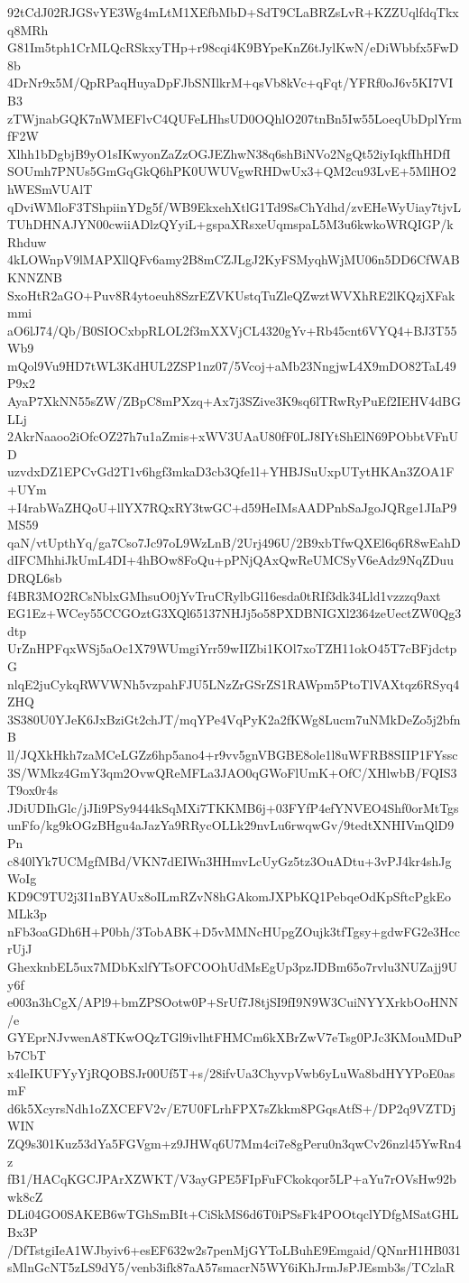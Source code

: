 92tCdJ02RJGSvYE3Wg4mLtM1XEfbMbD+SdT9CLaBRZsLvR+KZZUqlfdqTkxq8MRh
G81Im5tph1CrMLQcRSkxyTHp+r98cqi4K9BYpeKnZ6tJylKwN/eDiWbbfx5FwD8b
4DrNr9x5M/QpRPaqHuyaDpFJbSNIlkrM+qsVb8kVc+qFqt/YFRf0oJ6v5KI7VIB3
zTWjnabGQK7nWMEFlvC4QUFeLHhsUD0OQhlO207tnBn5Iw55LoeqUbDplYrmfF2W
Xlhh1bDgbjB9yO1sIKwyonZaZzOGJEZhwN38q6shBiNVo2NgQt52iyIqkfIhHDfI
SOUmh7PNUs5GmGqGkQ6hPK0UWUVgwRHDwUx3+QM2cu93LvE+5MlHO2hWESmVUAlT
qDviWMloF3TShpiinYDg5f/WB9EkxehXtlG1Td9SsChYdhd/zvEHeWyUiay7tjvL
TUhDHNAJYN00cwiiADlzQYyiL+gspaXRsxeUqmspaL5M3u6kwkoWRQIGP/kRhduw
4kLOWnpV9lMAPXllQFv6amy2B8mCZJLgJ2KyFSMyqhWjMU06n5DD6CfWABKNNZNB
SxoHtR2aGO+Puv8R4ytoeuh8SzrEZVKUstqTuZleQZwztWVXhRE2lKQzjXFakmmi
aO6lJ74/Qb/B0SIOCxbpRLOL2f3mXXVjCL4320gYv+Rb45cnt6VYQ4+BJ3T55Wb9
mQol9Vu9HD7tWL3KdHUL2ZSP1nz07/5Vcoj+aMb23NngjwL4X9mDO82TaL49P9x2
AyaP7XkNN55sZW/ZBpC8mPXzq+Ax7j3SZive3K9sq6lTRwRyPuEf2IEHV4dBGLLj
2AkrNaaoo2iOfcOZ27h7u1aZmis+xWV3UAaU80fF0LJ8IYtShElN69PObbtVFnUD
uzvdxDZ1EPCvGd2T1v6hgf3mkaD3cb3Qfe1l+YHBJSuUxpUTytHKAn3ZOA1F+UYm
+I4rabWaZHQoU+llYX7RQxRY3twGC+d59HeIMsAADPnbSaJgoJQRge1JIaP9MS59
qaN/vtUpthYq/ga7Cso7Jc97oL9WzLnB/2Urj496U/2B9xbTfwQXEl6q6R8wEahD
dIFCMhhiJkUmL4DI+4hBOw8FoQu+pPNjQAxQwReUMCSyV6eAdz9NqZDuuDRQL6sb
f4BR3MO2RCsNblxGMhsuO0jYvTruCRylbGl16esda0tRIf3dk34Lld1vzzzq9axt
EG1Ez+WCey55CCGOztG3XQl65137NHJj5o58PXDBNIGXl2364zeUectZW0Qg3dtp
UrZnHPFqxWSj5aOc1X79WUmgiYrr59wIIZbi1KOl7xoTZH11okO45T7cBFjdctpG
nlqE2juCykqRWVWNh5vzpahFJU5LNzZrGSrZS1RAWpm5PtoTlVAXtqz6RSyq4ZHQ
3S380U0YJeK6JxBziGt2chJT/mqYPe4VqPyK2a2fKWg8Lucm7uNMkDeZo5j2bfnB
ll/JQXkHkh7zaMCeLGZz6hp5ano4+r9vv5gnVBGBE8ole1l8uWFRB8SIIP1FYssc
3S/WMkz4GmY3qm2OvwQReMFLa3JAO0qGWoFlUmK+OfC/XHlwbB/FQIS3T9ox0r4s
JDiUDIhGlc/jJIi9PSy9444kSqMXi7TKKMB6j+03FYfP4efYNVEO4Shf0orMtTgs
unFfo/kg9kOGzBHgu4aJazYa9RRycOLLk29nvLu6rwqwGv/9tedtXNHIVmQlD9Pn
c840lYk7UCMgfMBd/VKN7dEIWn3HHmvLcUyGz5tz3OuADtu+3vPJ4kr4shJgWoIg
KD9C9TU2j3I1nBYAUx8oILmRZvN8hGAkomJXPbKQ1PebqeOdKpSftcPgkEoMLk3p
nFb3oaGDh6H+P0bh/3TobABK+D5vMMNcHUpgZOujk3tfTgsy+gdwFG2e3HccrUjJ
GhexknbEL5ux7MDbKxlfYTsOFCOOhUdMsEgUp3pzJDBm65o7rvlu3NUZajj9Uy6f
e003n3hCgX/APl9+bmZPSOotw0P+SrUf7J8tjSI9fI9N9W3CuiNYYXrkbOoHNN/e
GYEprNJvwenA8TKwOQzTGl9ivlhtFHMCm6kXBrZwV7eTsg0PJc3KMouMDuPb7CbT
x4leIKUFYyYjRQOBSJr00Uf5T+s/28ifvUa3ChyvpVwb6yLuWa8bdHYYPoE0asmF
d6k5XcyrsNdh1oZXCEFV2v/E7U0FLrhFPX7sZkkm8PGqsAtfS+/DP2q9VZTDjWIN
ZQ9s301Kuz53dYa5FGVgm+z9JHWq6U7Mm4ci7e8gPeru0n3qwCv26nzl45YwRn4z
fB1/HACqKGCJPArXZWKT/V3ayGPE5FIpFuFCkokqor5LP+aYu7rOVsHw92bwk8cZ
DLi04GO0SAKEB6wTGhSmBIt+CiSkMS6d6T0iPSsFk4POOtqclYDfgMSatGHLBx3P
/DfTstgiIeA1WJbyiv6+esEF632w2s7penMjGYToLBuhE9Emgaid/QNnrH1HB031
sMlnGcNT5zLS9dY5/venb3ifk87aA57smacrN5WY6iKhJrmJsPJEsmb3s/TCzlaR
